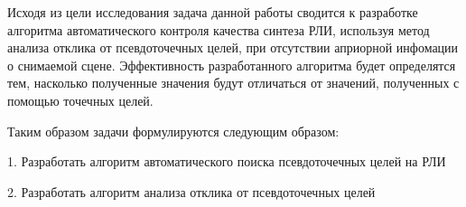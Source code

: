 	Исходя из цели исследования задача данной работы сводится к разработке алгоритма автоматического контроля качества синтеза РЛИ, используя метод анализа отклика от псевдоточечных целей, при отсутствии априорной инфомации о снимаемой сцене. Эффективность разработанного алгоритма будет определятся тем, насколько полученные значения будут отличаться от значений, полученных с помощью точечных целей.

	Таким образом задачи формулируются следующим образом:
	
	1. Разработать алгоритм автоматического поиска псевдоточечных целей на РЛИ
	
	2. Разработать алгоритм анализа отклика от псевдоточечных целей

\newpage
